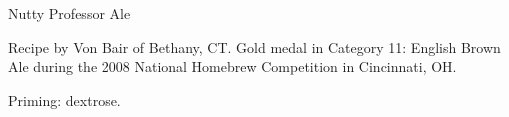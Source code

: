 \begin{recipe}{Nutty Professor Ale} %

\begin{aboutblock}
Recipe by Von Bair of Bethany, CT. Gold medal in Category 11: English Brown Ale
during the 2008 National Homebrew Competition in Cincinnati, OH.
\sourceaha
\end{aboutblock}


\begin{methodandtiming}

\begin{mashsteps}
\end{mashsteps}

\begin{fermentationsteps}
\end{fermentationsteps}

\begin{directions}
Priming:  dextrose.
\end{directions}

\end{methodandtiming}

\recipebreak

\begin{ingredientsblock}

\begin{malts}
\end{malts}

\begin{hops}
\end{hops}


\end{ingredientsblock}

\end{recipe}

